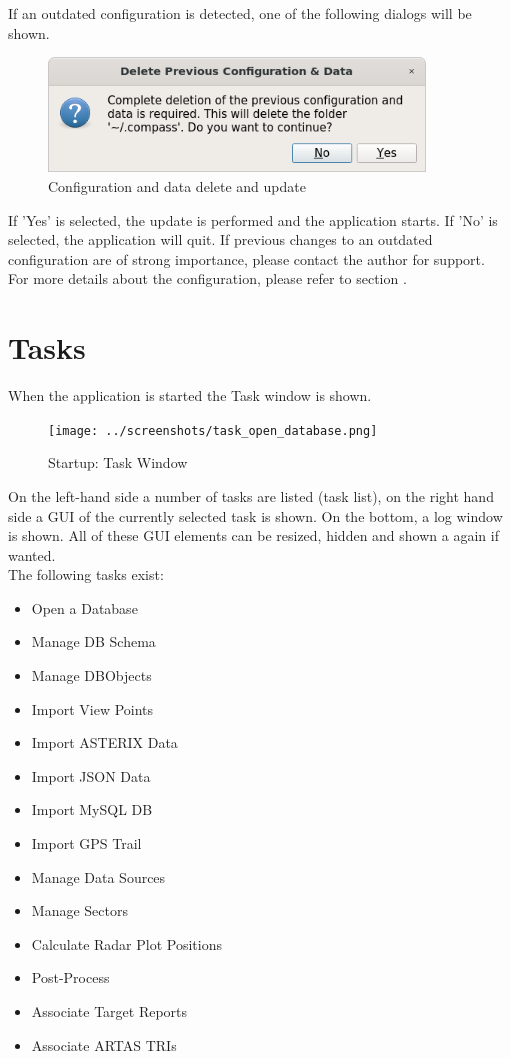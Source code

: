 If an outdated configuration is detected, one of the following dialogs will be shown.

\begin{figure}[H]
    \includegraphics[width=10cm]{../screenshots/config_data_delete_update.png}
  \caption{Configuration and data delete and update}
\end{figure}

If 'Yes' is selected, the update is performed and the application starts. If 'No' is selected, the application will quit. If previous changes to an outdated configuration are of strong importance, please contact the author for support. \\

For more details about the configuration, please refer to section .

\section{Tasks}

When the application is started the Task window is shown. 

\begin{figure}[H]
  \hspace*{-2.5cm}
    \texttt{[image: ../screenshots/task\_open\_database.png]}
  \caption{Startup: Task Window}
\end{figure}

On the left-hand side a number of tasks are listed (task list), on the right hand side a GUI of the currently selected task is shown. On the bottom, a log window is shown. All of these GUI elements can be resized, hidden and shown a again if wanted. \\


The following tasks exist:
\begin{itemize}
 \item Open a Database
 \item Manage DB Schema
 \item Manage DBObjects
 \item Import View Points
 \item Import ASTERIX Data
 \item Import JSON Data
 \item Import MySQL DB
 \item Import GPS Trail
 \item Manage Data Sources
 \item Manage Sectors
 \item Calculate Radar Plot Positions
 \item Post-Process
 \item Associate Target Reports
 \item Associate ARTAS TRIs
\end{itemize}
\  \\

